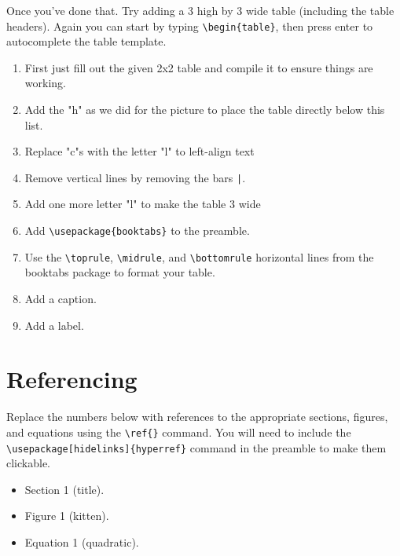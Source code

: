     Once you've done that. Try adding a 3 high by 3 wide table (including the table headers). Again you can start by typing 
    \verb"\begin{table}", then press enter to autocomplete the table template. 
    \begin{enumerate}
        \item First just fill out the given 2x2 table and compile it to ensure things are working.
        \item Add the "h" as we did for the picture to place the table directly below this list.
        \item Replace "c"s with the letter "l" to left-align text
        \item Remove vertical lines by removing the bars \verb"|".
        \item Add one more letter "l" to make the table 3 wide
        \item Add \verb"\usepackage{booktabs}" to the preamble.
        \item Use the \verb"\toprule", \verb"\midrule", and \verb"\bottomrule" horizontal lines from the booktabs package to format your table.
        \item Add a caption.
        \item Add a label.
    \end{enumerate}

    \section{Referencing}
        Replace the numbers below with references to the appropriate sections, figures, and equations using the \verb"\ref{}" command. You will need to include the \verb"\usepackage[hidelinks]{hyperref}" command in the preamble to make them clickable.

        \begin{itemize}
            \item Section 1 (title).
            \item Figure 1 (kitten).
            \item Equation 1 (quadratic).
        \end{itemize}
        

        

        
        
    


